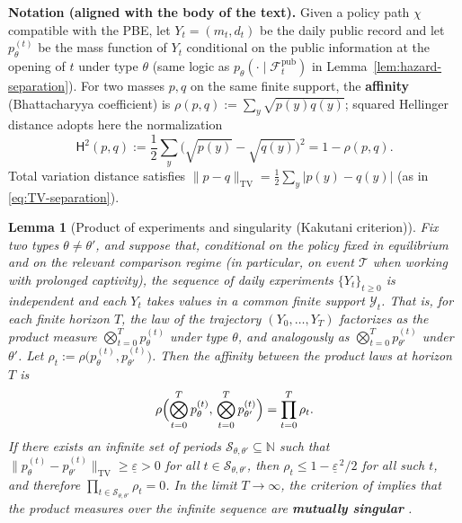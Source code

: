 \documentclass[12pt,a4paper]{article}
\providecommand{\textcite}{\citet}
\theoremstyle{plain}
\newtheorem{lemma}[theorem]{Lemma}
\theoremstyle{definition}
\theoremstyle{remark}
\newcommand{\1}{\mathbf{1}}
\begin{document}
\medskip\noindent\textbf{Notation \textup{(}aligned with the body of the text\textup{)}.}
Given a policy path $\chi$ compatible with the PBE, let $Y_t=(m_t,d_t)$ be the daily
public record and let $p_\theta^{(t)}$ be the mass function of $Y_t$ conditional on the
public information at the opening of $t$ under type $\theta$ \textup{(same logic as
$p_\theta(\cdot\mid\mathcal{F}_t^{\mathrm{pub}})$ in
Lemma~\ref{lem:hazard-separation})}. For two masses $p,q$ on the same finite support,
the \textbf{affinity} \textup{(Bhattacharyya coefficient)} is
$\rho(p,q):=\sum_y \sqrt{p(y)q(y)}$; squared Hellinger distance adopts here the
normalization
\[
\mathsf{H}^2(p,q):=\frac{1}{2}\sum_y\bigl(\sqrt{p(y)}-\sqrt{q(y)}\bigr)^2 = 1-\rho(p,q).
\]
Total variation distance satisfies
$\|p-q\|_{\mathrm{TV}}=\tfrac{1}{2}\sum_y|p(y)-q(y)|$ \textup{(as in
\eqref{eq:TV-separation})}.

\begin{lemma}[Product of experiments and singularity \textup{(}Kakutani criterion\textup{)}]
\label{lem:general-id-appendix}
Fix two types $\theta\neq\theta'$, and suppose that, conditional on the policy fixed in
equilibrium and on the relevant comparison regime \textup{(in particular, on event
$\mathcal{T}$ when working with prolonged captivity)}, the sequence of daily experiments
$\{Y_t\}_{t\ge 0}$ is independent and each $Y_t$ takes values in a common finite support
$\mathcal{Y}_t$. That is, for each finite horizon $T$, the law of the trajectory
$(Y_0,\ldots,Y_T)$ factorizes as the product measure $\bigotimes_{t=0}^{T}
p_\theta^{(t)}$ under type $\theta$, and analogously as $\bigotimes_{t=0}^{T}
p_{\theta'}^{(t)}$ under $\theta'$. Let
$\rho_t:=\rho\bigl(p_\theta^{(t)},p_{\theta'}^{(t)}\bigr)$. Then the affinity between
the product laws at horizon $T$ is
\begin{equation}
\label{eq:appendix-rho-product}
\rho\Bigl(\bigotimes_{t=0}^{T} p_\theta^{(t)},\,\bigotimes_{t=0}^{T} p_{\theta'}^{(t)}\Bigr)=\prod_{t=0}^{T}\rho_t.
\end{equation}
If there exists an infinite set of periods
$\mathcal{S}_{\theta,\theta'}\subseteq\mathbb{N}$ such that
$\|p_\theta^{(t)}-p_{\theta'}^{(t)}\|_{\mathrm{TV}}\ge \underline{\varepsilon}>0$ for
all $t\in\mathcal{S}_{\theta,\theta'}$, then
$\rho_t\le 1-\underline{\varepsilon}^{\,2}/2$ for all such $t$, and therefore
$\prod_{t\in\mathcal{S}_{\theta,\theta'}}\rho_t=0$. In the limit $T\to\infty$, the
criterion of \textcite{Kakutani1948} implies that the product measures over the infinite
sequence are \textbf{mutually singular} \textcite{Shiryaev2019Probability}.
\end{lemma}
\end{document}
